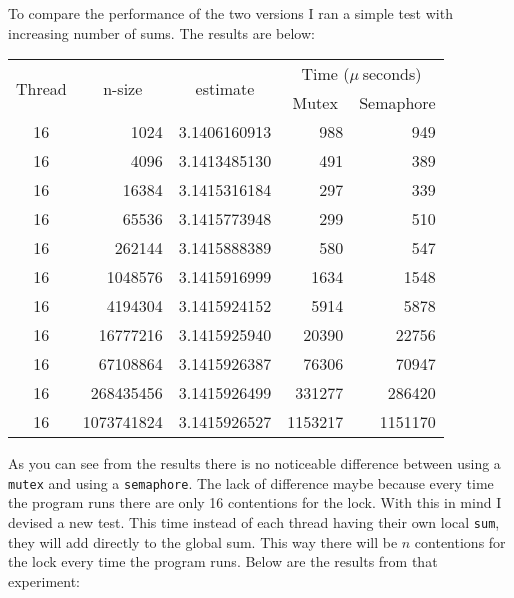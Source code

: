 \documentclass[12pt]{article}
\begin{document}
To compare the performance of the two versions I ran a simple test with increasing number of sums. The results are below:

\begin{center}
    \begin{tabular}{| c | r | c | r | r |}
        \hline
        \multirow{2}{*}{Thread} & \multicolumn{1}{|c|}{\multirow{2}{*}{n-size}} & \multirow{2}{*}{estimate} & \multicolumn{2}{|c|}{Time ($\mu\:$seconds)}\\ \cline{4-5}
         & & & \multicolumn{1}{|c}{Mutex} & \multicolumn{1}{|c|}{Semaphore}\\ \hline
        16 &       1024 & 3.1406160913 &     988 &     949\\
        16 &       4096 & 3.1413485130 &     491 &     389\\
        16 &      16384 & 3.1415316184 &     297 &     339\\
        16 &      65536 & 3.1415773948 &     299 &     510\\
        16 &     262144 & 3.1415888389 &     580 &     547\\
        16 &    1048576 & 3.1415916999 &    1634 &    1548\\
        16 &    4194304 & 3.1415924152 &    5914 &    5878\\
        16 &   16777216 & 3.1415925940 &   20390 &   22756\\
        16 &   67108864 & 3.1415926387 &   76306 &   70947\\
        16 &  268435456 & 3.1415926499 &  331277 &  286420\\
        16 & 1073741824 & 3.1415926527 & 1153217 & 1151170\\
        \hline
    \end{tabular}
\end{center}

As you can see from the results there is no noticeable difference between using a \texttt{mutex} and using a \texttt{semaphore}. The lack of difference maybe because every time the program runs there are only 16 contentions for the lock. With this in mind I devised a new test. This time instead of each thread having their own local \texttt{sum}, they will add directly to the global sum. This way there will be $n$ contentions for the lock every time the program runs. Below are the results from that experiment:
\end{document}
